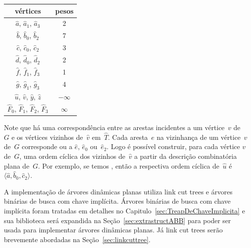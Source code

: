 \hspace{-.7cm}
\begin{minipage}[b]{0.2\textwidth}
\centering
\begin{tabular}{| c  c |} 
 \hline
 vértices & pesos\\
 \hline
 $\hat a$, $\hat a_1$, $\hat a_3$ & 2 \\ 
 \hline
 $\hat b$, $\hat b_0$, $\hat b_2$ & 7 \\
 \hline
 $\hat c$, $\hat c_0$, $\hat c_2$ & 3 \\
 \hline
 $\hat d$, $\hat d_0$, $\hat d_2$ & 2 \\
 \hline
 $\hat f$, $\hat f_1$, $\hat f_3$ & 1 \\
 \hline
 $\hat g$, $\hat g_1$, $\hat g_3$ & 4 \\
 \hline
 $\hat u$, $\hat v$, $\hat y$, $\hat z$ & $-\infty$ \\
 \hline
 $\hat F_0$, $\hat F_1$, $\hat F_2$, $\hat F_3$ & $\infty$ \\
 \hline
\end{tabular}
\end{minipage}
\hspace{1.3cm}
\begin{minipage}[b]{0.5\textwidth}
    \centering

\label{fig:MSF-figura-3}
    \end{minipage}

Note que há uma correspondência entre as arestas incidentes a um vértice~$v$ de~$G$ e os vértices vizinhos de~$\hat v$ em~$\hat T$.
Cada aresta~$e$ na vizinhança de um vértice~$v$ de~$G$ corresponde ou a $\hat e$, $\hat e_0$ ou~$\hat e_2$. 
Logo é possível construir, para cada vértice $v$ de~$G$, uma ordem cíclica dos vizinhos de~$\hat v$ a partir da descrição combinatória plana de~$G$.
Por exemplo, se temos , então a respectiva ordem cíclica de~$\hat u$ é~$\langle \hat a, \hat b_0, \hat c_2 \rangle$.



A implementação de árvores dinâmicas planas utiliza link cut trees e árvores binárias de busca com chave implícita.
Árvores binárias de busca com chave implícita foram tratadas em detalhes no Capitulo~\ref{sec:TreapDeChaveImplicita} e sua biblioteca será expandida na Seção~\ref{sec:extrastructABB} para poder ser usada para implementar árvores dinâmicas planas.
Já link cut trees serão brevemente abordadas na Seção~\ref{sec:linkcuttree}.

